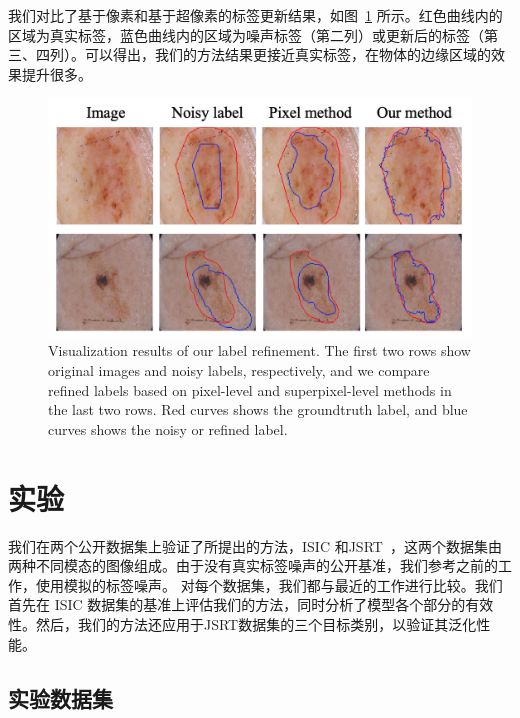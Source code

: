 我们对比了基于像素和基于超像素的标签更新结果，如图~\ref{fig:vis_correct} 所示。红色曲线内的区域为真实标签，蓝色曲线内的区域为噪声标签（第二列）或更新后的标签（第三、四列）。可以得出，我们的方法结果更接近真实标签，在物体的边缘区域的效果提升很多。
    \begin{figure}[tbp]
        \centering 
        \includegraphics[width=1.0\textwidth]{img/c4/b_correct2.png}
        {Visualization results of our label refinement. The first two rows show original images and noisy labels, respectively, and we compare refined labels based on pixel-level and superpixel-level methods in the last two rows. Red curves shows the groundtruth label, and blue curves shows the noisy or refined label.}
        \label{fig:vis_correct}
    \end{figure}

\section{实验}

我们在两个公开数据集上验证了所提出的方法，ISIC\citep{Gutman2018SkinLA} 和JSRT~\citep{Shiraishi2000DevelopmentOA,Ginneken2006SegmentationOA}，这两个数据集由两种不同模态的图像组成。由于没有真实标签噪声的公开基准，我们参考之前的工作，使用模拟的标签噪声。
对每个数据集，我们都与最近的工作进行比较。我们首先在 ISIC 数据集的基准上评估我们的方法，同时分析了模型各个部分的有效性。然后，我们的方法还应用于JSRT数据集的三个目标类别，以验证其泛化性能。

\subsection{实验数据集}
